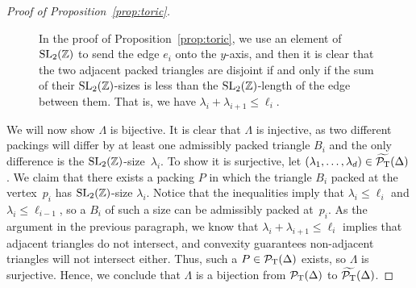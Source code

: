 \documentclass[pdftex]{sigma}
\numberwithin{equation}{section}
\def\Z{{\mathbb Z}}
\newcommand{\De}{\Delta}
\newcommand{\PT}{\mathcal{P}_{\rm T}}
\newcommand{\PTtilde}{\widetilde{\PT}}
\newcommand{\SL}{{\rm SL}_2(\Z)}
\begin{document}
\begin{proof}[Proof of Proposition~\ref{prop:toric}]
\begin{figure}[t] \centering
 \caption{In the proof of Proposition~\ref{prop:toric}, we use an element of $\SL$ to send the edge $e_i$ onto the $y$-axis, and then it is clear that the two adjacent packed triangles are disjoint if and only if the sum of their $\SL$-sizes is less than the $\SL$-length of the edge between them. That is, we have $\lambda_{i}+\lambda_{i+1}\leq \ell_i$.} \label{fig:toric-proof}
\end{figure}

We will now show $\Lambda$ is bijective.
It is clear that $\Lambda$ is injective, as two different packings will differ by at least one admissibly packed triangle $B_i$ and the only difference is the $\SL$-size~$\lambda_i$. To show it is surjective, let $(\lambda_1,\ldots,\lambda_d) \in \PTtilde(\De)$. We claim that there exists a packing $P$ in which the triangle $B_i$ packed at the vertex~$p_i$ has $\SL$-size $\lambda_i$. Notice that the inequalities imply that $\lambda_i \leq \ell_i$ and $\lambda_i \leq \ell_{i-1}$, so a $B_i$ of such a size can be admissibly packed at~$p_i$. As the argument in the previous paragraph, we know that $\lambda_i+\lambda_{i+1}\leq \ell_i$ implies that adjacent triangles do not intersect, and convexity guarantees non-adjacent triangles will not intersect either.
Thus, such a $P\in\PT(\De)$ exists, so $\Lambda$ is surjective.
Hence, we conclude that $\Lambda$ is a bijection from $\PT(\De)$ to $\PTtilde(\De)$.




\end{proof}
\end{document}
